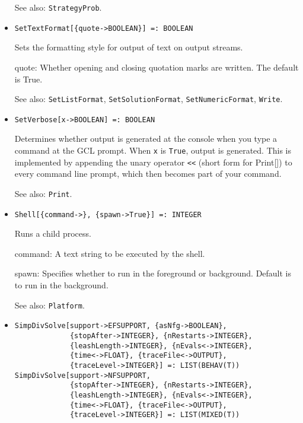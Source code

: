 \begin{itemize}
{\it for} {\tt T = FLOAT, RATIONAL}
\bd
Sets the components of \verb+profile+ for \verb+player+ to be equal
to \verb+value+.  It is an error if \verb+profile+ and \verb+player+
are not from the same normal form game, or if the length of \verb+value+
is not the same as the number of strategies for \verb+player+ in the
support of \verb+profile+.  Returns \verb+profile+.
\item [See also:] \verb+StrategyProb+.
\ed

\item{}
\protect \large \begin{verbatim}
SetTextFormat[{quote->BOOLEAN}] =: BOOLEAN
\end{verbatim}\normalsize

\bd
Sets the formatting style for output of text on output streams.
\bd
\item [quote:] Whether opening and closing quotation marks are
written.  The default is True.  
\ed
\item [See also:] \verb+SetListFormat+, \verb+SetSolutionFormat+, 
\verb+SetNumericFormat+, \verb+Write+.
\ed

\item{}
\protect \large \begin{verbatim}
SetVerbose[x->BOOLEAN] =: BOOLEAN
\end{verbatim}\normalsize

\bd 
Determines whether output is generated at the console when you
type a command at the GCL prompt.  When \verb+x+ is \verb+True+,
output is generated.  This is implemented by appending the unary
operator \verb+<<+ (short form for Print[]) to every command line
prompt, which then becomes part of your command.
\item [See also:] \verb+Print+.  
\ed

\item{}
\protect \large \begin{verbatim}
Shell[{command->}, {spawn->True}] =: INTEGER
\end{verbatim} \normalsize

\bd
Runs a child process.  
\bd
\item [command:] A text string to be executed by the shell.  
\item [spawn:] Specifies whether to run in the foreground or
background.  Default is to run in the background.  
\ed
\item [See also:] \verb+Platform+.
\ed

\item{}
\protect \large \begin{verbatim}
SimpDivSolve[support->EFSUPPORT, {asNfg->BOOLEAN}, 
             {stopAfter->INTEGER}, {nRestarts->INTEGER}, 
             {leashLength->INTEGER}, {nEvals<->INTEGER}, 
             {time<->FLOAT}, {traceFile<->OUTPUT},
             {traceLevel->INTEGER}] =: LIST(BEHAV(T))
SimpDivSolve[support->NFSUPPORT, 
             {stopAfter->INTEGER}, {nRestarts->INTEGER}, 
             {leashLength->INTEGER}, {nEvals<->INTEGER}, 
             {time<->FLOAT}, {traceFile<->OUTPUT},
             {traceLevel->INTEGER}] =: LIST(MIXED(T))
\end{verbatim}\normalsize


\end{itemize}
